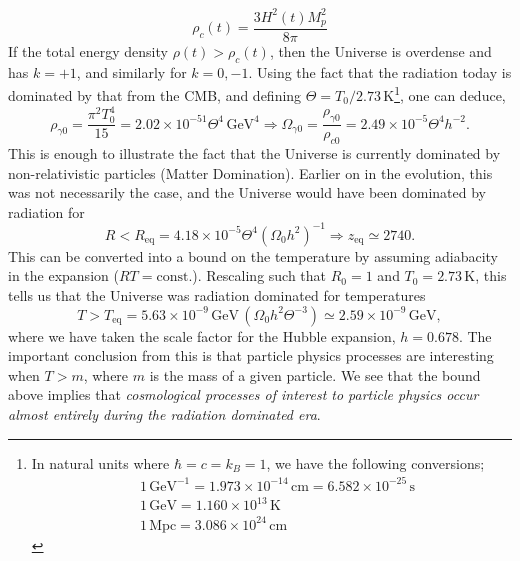 \documentclass[11pt]{article}
\numberwithin{equation}{section}
\numberwithin{figure}{section}
\numberwithin{table}{section}
\begin{document}
\begin{equation}
\rho_c(t) = \frac{3H^2(t)M_p^2}{8\pi}
\end{equation}
If the total energy density $\rho(t) > \rho_c(t)$, then the Universe is overdense and has $k = +1$, and similarly for $k=0, -1$. Using the fact that the radiation today is dominated by that from the CMB, and defining $\Theta = T_0/2.73 \, \mathrm{K}$\footnote{
In natural units where $\hbar = c = k_B = 1$, we have the following conversions;
\begin{align*}
&1 \, \mathrm{GeV}^{-1} = 1.973 \times 10^{-14}\,\mathrm{cm} = 6.582 \times 10^{-25} \, \mathrm{s} \\
&1 \, \mathrm{GeV} = 1.160 \times 10^{13} \, \mathrm{K} \\
&1 \, \mathrm{Mpc} = 3.086 \times 10^{24} \, \mathrm{cm}
\end{align*}
}, one can deduce,
\begin{equation}
\rho_{\gamma 0} = \frac{\pi^2 T_0^4}{15} = 2.02 \times 10^{-51} \Theta^4 \,\mathrm{GeV}^4 \Rightarrow \Omega_{\gamma 0} = \frac{\rho_{\gamma 0}}{\rho_{c 0}} = 2.49 \times 10^{-5} \Theta^4 h^{-2}.
\end{equation}
This is enough to illustrate the fact that the Universe is currently dominated by non-relativistic particles (Matter Domination). Earlier on in the evolution, this was not necessarily the case, and the Universe would have been dominated by radiation for
\begin{equation}
R < R_{\mathrm{eq}} = 4.18 \times 10^{-5}\Theta^4(\Omega_0 h^2)^{-1} \Rightarrow z_{\mathrm{eq}} \simeq 2740.
\end{equation}
This can be converted into a bound on the temperature by assuming adiabacity in the expansion ($RT = \mathrm{const.}$). Rescaling such that $R_0 = 1$ and $T_0 = 2.73 \, \mathrm{K}$, this tells us that the Universe was radiation dominated for temperatures
\begin{equation}
T > T_{\mathrm{eq}} = 5.63 \times 10^{-9} \, \mathrm{GeV}\,(\Omega_0 h^2 \Theta^{-3}) \simeq 2.59 \times 10^{-9} \, \mathrm{GeV},
\end{equation}
where we have taken the scale factor for the Hubble expansion, $h = 0.678$. The important conclusion from this is that particle physics processes are interesting when $T > m$, where $m$ is the mass of a given particle. We see that the bound above implies that \textit{cosmological processes of interest to particle physics occur almost entirely during the radiation dominated era}.
\end{document}
